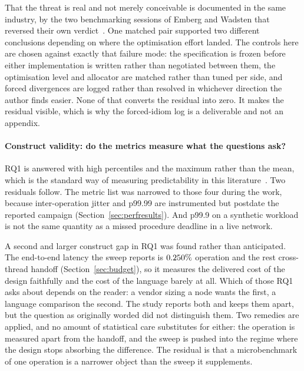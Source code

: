 \documentclass[english,twoside,openright,a4paper,censored,csm,software-track-2020]{HYthesisML}
\begin{document}
That the threat is real and not merely conceivable is documented in the same industry, by the two
benchmarking sessions of Emberg and Wadsten that reversed their own
verdict~\cite{emberg2023asn1}. One matched pair supported two different conclusions depending on
where the optimisation effort landed. The controls here are chosen against exactly that failure
mode: the specification is frozen before either implementation is written rather than negotiated
between them, the optimisation level and allocator are matched rather than tuned per side, and
forced divergences are logged rather than resolved in whichever direction the author finds easier.
None of that converts the residual into zero. It makes the residual visible, which is why the
forced-idiom log is a deliverable and not an appendix.

\paragraph{Construct validity: do the metrics measure what the questions ask?}
RQ1 is answered with high percentiles and the maximum rather than the mean, which is the standard
way of measuring predictability in this literature~\cite{dean2013tail}. Two residuals follow. The
metric list was narrowed to those four during the work, because inter-operation jitter and p99.99
are instrumented but postdate the reported campaign (Section~\ref{sec:perfresults}). And p99.9 on
a synthetic workload is not the same quantity as a missed procedure deadline in a live network.

A second and larger construct gap in RQ1 was found rather than anticipated. The end-to-end latency
the sweep reports is $0.250\%$ operation and the rest cross-thread handoff
(Section~\ref{sec:budget}), so it measures the delivered cost of the design faithfully and the
cost of the language barely at all. Which of those RQ1 asks about depends on the reader: a vendor
sizing a node wants the first, a language comparison the second. The study reports both and keeps
them apart, but the question as originally worded did not distinguish them. Two remedies are
applied, and no amount of statistical care substitutes for either: the operation is measured apart
from the handoff, and the sweep is pushed into the regime where the design stops absorbing the
difference. The residual is that a microbenchmark of one operation is a narrower object than the
sweep it supplements.
\end{document}
